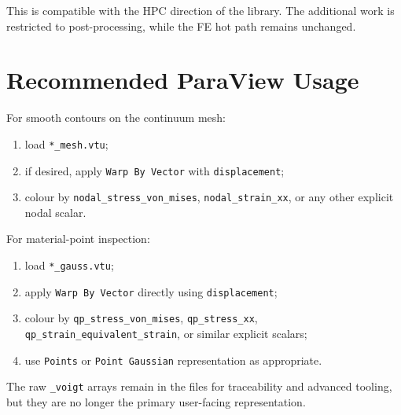 This is compatible with the HPC direction of the library.  The additional work
is restricted to post-processing, while the FE hot path remains unchanged.


\section{Recommended ParaView Usage}
\label{sec:vtk_tensor_filters_paraview}

For smooth contours on the continuum mesh:
\begin{enumerate}[nosep]
  \item load \texttt{*\_mesh.vtu};
  \item if desired, apply \texttt{Warp By Vector} with \texttt{displacement};
  \item colour by \texttt{nodal\_stress\_von\_mises},
        \texttt{nodal\_strain\_xx}, or any other explicit nodal scalar.
\end{enumerate}

For material-point inspection:
\begin{enumerate}[nosep]
  \item load \texttt{*\_gauss.vtu};
  \item apply \texttt{Warp By Vector} directly using \texttt{displacement};
  \item colour by \texttt{qp\_stress\_von\_mises},
        \texttt{qp\_stress\_xx}, \texttt{qp\_strain\_equivalent\_strain}, or
        similar explicit scalars;
  \item use \texttt{Points} or \texttt{Point Gaussian} representation as
        appropriate.
\end{enumerate}

The raw \texttt{\_voigt} arrays remain in the files for traceability and
advanced tooling, but they are no longer the primary user-facing
representation.

